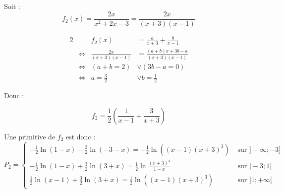 \documentclass[a4paper,10pt]{report}
\begin{document}
Soit :
\begin{equation*}
		f_2(x) =\frac{2x}{x^2 + 2x -3} = \frac{2x}{(x+3)(x-1)}
\end{equation*}

\begin{alignat*}{2}
	&                     &                f_2(x)  &= \frac{a}{x+3} +  \frac{b}{x-1}\\
	& \Longleftrightarrow & \frac{2x}{(x+3)(x-1)}  &=  \frac{(a+b)x + 3b -a}{(x+3)(x-1)} \\
	& \Longleftrightarrow & (a+b=2)               &\vee (3b-a = 0) \\
	& \Longleftrightarrow & a=\frac{3}{2}        &\vee b = \frac{1}{2}
\end{alignat*}

Donc :

\begin{displaymath}
	f_2 = \frac{1}{2} \left( \frac{1}{x-1} + \frac{3}{x+3} \right)
\end{displaymath}

Une primitive de $f_2$ est donc :
\begin{displaymath}
	P_2 = 
	\begin{cases}
		-\frac{1}{2}\ln(1-x) -\frac{3}{2}\ln(-3-x) = -\frac{1}{2} \ln((x-1)(x+3)^3)      & \text{ sur } ]-\infty ; -3]\\
		-\frac{1}{2}\ln(1-x) +\frac{3}{2}\ln(3+x)  = \frac{1}{2} \ln \frac{(x+3)^3}{1-x} & \text{ sur } ]-3 ; 1[\\
		\frac{1}{2}\ln(x-1) +\frac{3}{2}\ln(3+x)   = \frac{1}{2} \ln((x-1)(x+3)^3)       & \text{ sur } ]1 ; +\infty[
	\end{cases}
\end{displaymath}
\end{document}
